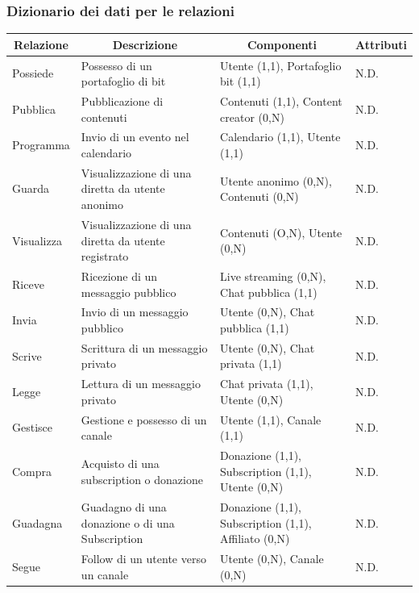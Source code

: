 \restoregeometry








\newpage
\setlength{\parskip}{0.5em}
\begin{landscape}
\subsubsection*{Dizionario dei dati per le relazioni}
\begin{center}
\begin{tabular}{ |p{5cm}|p{4cm}|p{7cm}|p{2cm}|  }
 \hline
 \multicolumn{1}{|c|}{\textbf{Relazione}} 
 & \multicolumn{1}{|c|}{\textbf{Descrizione}} 
 & \multicolumn{1}{|c|}{\textbf{Componenti}}
 & \multicolumn{1}{|c|}{\textbf{Attributi}}\\
 \hline
 Possiede & Possesso di un portafoglio di bit & Utente (1,1), Portafoglio bit (1,1) & N.D.\\
 \hline
 Pubblica & Pubblicazione di contenuti & Contenuti (1,1), Content creator (0,N) & N.D. \\
 \hline
 Programma & Invio di un evento nel calendario & Calendario (1,1), Utente (1,1) & N.D.\\
 \hline
 Guarda & Visualizzazione di una diretta da utente anonimo & Utente anonimo (0,N), Contenuti (0,N) & N.D.\\
 \hline
 Visualizza & Visualizzazione di una diretta da utente registrato & Contenuti (O,N), Utente (0,N) & N.D. \\
 \hline
 Riceve & Ricezione di un messaggio pubblico & Live streaming (0,N), Chat pubblica (1,1) & N.D.\\
 \hline
 Invia & Invio di un messaggio pubblico & Utente (0,N), Chat pubblica (1,1) & N.D.\\
 \hline
 Scrive & Scrittura di un messaggio privato & Utente (0,N), Chat privata (1,1) & N.D.\\
 \hline
 Legge & Lettura di un messaggio privato & Chat privata (1,1), Utente (0,N) & N.D.\\
 \hline
 Gestisce & Gestione e possesso di un canale & Utente (1,1), Canale (1,1) & N.D.\\
 \hline
 Compra & Acquisto di una subscription o donazione & Donazione (1,1), Subscription (1,1), Utente (0,N) & N.D.\\
 \hline
 Guadagna & Guadagno di una donazione o di una Subscription & Donazione (1,1), Subscription (1,1), Affiliato (0,N) & N.D.\\
 \hline
 Segue & Follow di un utente verso un canale & Utente (0,N), Canale (0,N) & N.D.\\
 \hline
\end{tabular}
\end{center}
\end{landscape}
\restoregeometry















